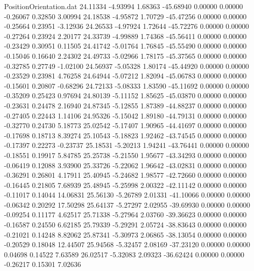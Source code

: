 \begin{filecontents}{PositionOrientation.dat}
  24.11334   -4.93994    1.68363   -45.68940    0.00000    0.00000   -0.26067    0.32850    3.00994
  24.18538   -4.95872    1.70729   -45.47256    0.00000    0.00000   -0.25664    0.23951   -3.12936
  24.26533   -4.97924    1.72644   -45.72276    0.00000    0.00000   -0.27264    0.23924    2.20177
  24.33739   -4.99889    1.74368   -45.56411    0.00000    0.00000   -0.23429    0.30951    0.11505
  24.41742   -5.01764    1.76845   -45.55490    0.00000    0.00000   -0.15046    0.16640    2.24302
  24.49733   -5.02966    1.78175   -45.37565    0.00000    0.00000   -0.32785    0.27749   -1.02100
  24.56937   -5.05328    1.80174   -45.44920    0.00000    0.00000   -0.23529    0.23981    4.76258
  24.64944   -5.07212    1.82094   -45.06783    0.00000    0.00000   -0.15601    0.20807   -0.68296
  24.72133   -5.08333    1.83590   -45.11692    0.00000    0.00000   -0.35209    0.25423    0.97694
  24.80139   -5.11152    1.85625   -45.03870    0.00000    0.00000   -0.23631    0.24478    2.16940
  24.87345   -5.12855    1.87389   -44.88237    0.00000    0.00000   -0.27405    0.22443    1.14106
  24.95326   -5.15042    1.89180   -44.79131    0.00000    0.00000   -0.32770    0.24730    5.18773
  25.02542   -5.17407    1.90965   -44.41697    0.00000    0.00000   -0.17698    0.18713    8.39274
  25.10543   -5.18823    1.92462   -43.74545    0.00000    0.00000   -0.17397    0.22273   -0.23737
  25.18531   -5.20213    1.94241   -43.76441    0.00000    0.00000   -0.18551    0.19917    5.84785
  25.25738   -5.21550    1.95677   -43.34293    0.00000    0.00000   -0.06419    0.12088    3.93900
  25.33726   -5.22062    1.96642   -43.02831    0.00000    0.00000   -0.36291    0.26801    4.17911
  25.40945   -5.24682    1.98577   -42.72660    0.00000    0.00000   -0.16445    0.21805    7.68939
  25.48945   -5.25998    2.00322   -42.11142    0.00000    0.00000   -0.11017    0.14044   14.06831
  25.56130   -5.26789    2.01331   -41.10066    0.00000    0.00000   -0.06342    0.20292   17.50298
  25.64137   -5.27297    2.02955   -39.69930    0.00000    0.00000   -0.09254    0.11177    4.62517
  25.71338   -5.27964    2.03760   -39.36623    0.00000    0.00000   -0.16587    0.24550    6.62185
  25.79339   -5.29291    2.05724   -38.83643    0.00000    0.00000   -0.21021    0.14248    8.82062
  25.87341   -5.30973    2.06865   -38.13054    0.00000    0.00000   -0.20529    0.18048   12.44507
  25.94568   -5.32457    2.08169   -37.23120    0.00000    0.00000    0.04698    0.14522    7.63589
  26.02517   -5.32083    2.09323   -36.62424    0.00000    0.00000   -0.26217    0.15301    7.02636

\end{filecontents}
